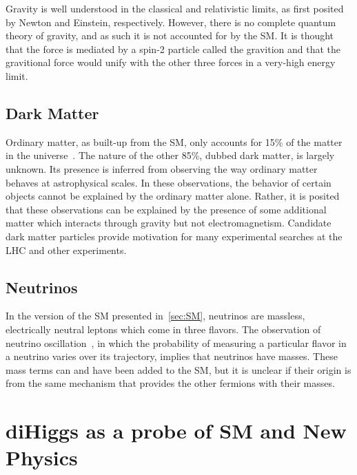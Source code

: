 Gravity is well understood in the classical and relativistic limits, as first posited by Newton
and Einstein, respectively. However, there is no complete quantum theory of gravity, and as such
it is not accounted for by the SM. It is thought that the force is mediated by a spin-2 particle
called the gravition and that the gravitional force would unify with the other three forces
in a very-high energy limit.

\subsection{Dark Matter\label{subsec:dark}}

Ordinary matter, as built-up from the SM, only accounts for 15\% of the
matter in the universe~\cite{Clowe:2006eq}. The nature of the other 85\%, dubbed dark matter, is
largely unknown. Its presence is inferred from observing the way ordinary matter behaves at
astrophysical scales. In these observations, the behavior of certain objects cannot be explained
by the ordinary matter alone. Rather, it is posited that these observations can be explained by
the presence of some additional matter which interacts through gravity but not electromagnetism.
Candidate dark matter particles provide motivation for many experimental searches at the LHC and
other experiments.

\subsection{Neutrinos\label{subsec:neu}}

In the version of the SM presented in~\ref{sec:SM}, neutrinos are massless, electrically neutral
leptons which come in three flavors. The observation of neutrino oscillation~\cite{Fukuda:1998mi},
in which the probability of measuring a particular flavor in a neutrino varies over its trajectory,
implies that neutrinos have masses. These mass terms can and have been added to the SM, but it is
unclear if their origin is from the same mechanism that provides the other fermions with their
masses.

\section{diHiggs as a probe of SM and New Physics\label{sec:diHiggs}}


